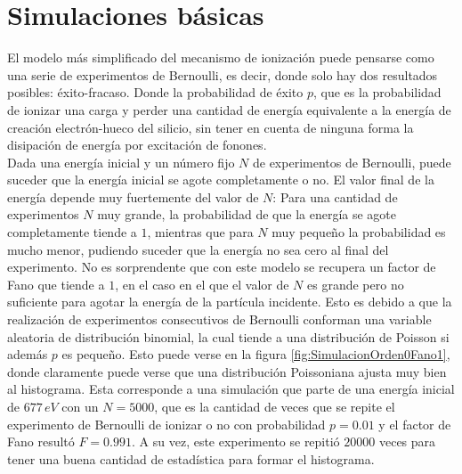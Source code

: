 \section{Simulaciones básicas}
\noindent El modelo más simplificado del mecanismo de ionización puede pensarse como una serie de experimentos de Bernoulli, es decir, donde solo hay dos resultados posibles: éxito-fracaso. Donde la probabilidad de éxito $p$, que es la probabilidad de ionizar una carga y perder una cantidad de energía equivalente a la energía de creación electrón-hueco del silicio, sin tener en cuenta de ninguna forma la disipación de energía por excitación de fonones.\\
\indent Dada una energía inicial y un número fijo $N$ de experimentos de Bernoulli, puede suceder que la energía inicial se agote completamente o no. El valor final de la energía depende muy fuertemente del valor de $N$: Para una cantidad de experimentos $N$ muy grande, la probabilidad de que la energía se agote completamente tiende a $1$, mientras que para $N$ muy pequeño la probabilidad es mucho menor, pudiendo suceder que la energía no sea cero al final del experimento. No es sorprendente que con este modelo se recupera un factor de Fano que tiende a $1$, en el caso en el que el valor de $N$ es grande pero no suficiente para agotar la energía de la partícula incidente. Esto es debido a que la realización de experimentos consecutivos de Bernoulli conforman una variable aleatoria de distribución binomial, la cual tiende a una distribución de Poisson si además $p$ es pequeño. Esto puede verse en la figura \ref{fig:SimulacionOrden0Fano1}, donde claramente puede verse que una distribución Poissoniana ajusta muy bien al histograma. Esta corresponde a una simulación que parte de una energía inicial de $677\,\si{eV}$ con un $N = 5000$, que es la cantidad de veces que se repite el experimento de Bernoulli de ionizar o no con probabilidad $p=0.01$ y el factor de Fano resultó $F = 0.991$. A su vez, este experimento se repitió $20000$ veces para tener una buena cantidad de estadística para formar el histograma.\\
